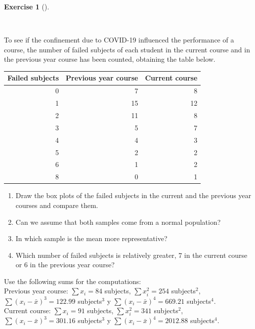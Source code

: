 \documentclass[
  a4paper,
]{scrreport}
\theoremstyle{definition}
\newtheorem{exercise}{Exercise}[chapter]
\theoremstyle{remark}
\begin{document}
\begin{exercise}[]\protect\hypertarget{exr-1}{}\label{exr-1}

~

To see if the confinement due to COVID-19 influenced the performance of
a course, the number of failed subjects of each student in the current
course and in the previous year course has been counted, obtaining the
table below.

\begin{table}
\centering
\begin{tabular}{r|r|r}
\hline
Failed subjects & Previous year course & Current course\\
\hline
0 & 7 & 8\\
\hline
1 & 15 & 12\\
\hline
2 & 11 & 8\\
\hline
3 & 5 & 7\\
\hline
4 & 4 & 3\\
\hline
5 & 2 & 2\\
\hline
6 & 1 & 2\\
\hline
8 & 0 & 1\\
\hline
\end{tabular}
\end{table}

\begin{enumerate}
\def\labelenumi{\alph{enumi}.}
\item
  Draw the box plots of the failed subjects in the current and the
  previous year courses and compare them.
\item
  Can we assume that both samples come from a normal population?
\item
  In which sample is the mean more representative?
\item
  Which number of failed subjects is relatively greater, 7 in the
  current course or 6 in the previous year course?
\end{enumerate}

Use the following sums for the computations:\\
Previous year course: \(\sum x_i=84\) subjects, \(\sum x_i^2=254\)
subjects\(^2\), \(\sum (x_i-\bar x)^3=122.99\) subjects\(^3\) y
\(\sum (x_i-\bar x)^4=669.21\) subjects\(^4\).\\
Current course: \(\sum x_i=91\) subjects, \(\sum x_i^2=341\)
subjects\(^2\), \(\sum (x_i-\bar x)^3=301.16\) subjects\(^3\) y
\(\sum (x_i-\bar x)^4=2012.88\) subjects\(^4\).

\begin{tcolorbox}[enhanced jigsaw, colback=white, title=\textcolor{quarto-callout-tip-color}{\faLightbulb}\hspace{0.5em}{Solution}, arc=.35mm, colbacktitle=quarto-callout-tip-color!10!white, breakable, leftrule=.75mm, colframe=quarto-callout-tip-color-frame, opacitybacktitle=0.6, left=2mm, toptitle=1mm, bottomtitle=1mm, titlerule=0mm, rightrule=.15mm, bottomrule=.15mm, toprule=.15mm, opacityback=0, coltitle=black]


\end{tcolorbox}
\end{exercise}
\end{document}
